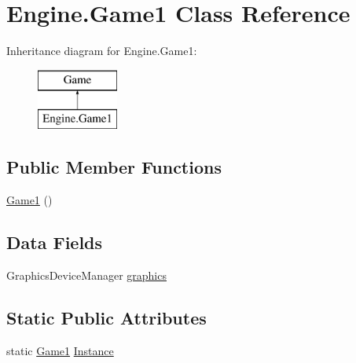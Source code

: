 \hypertarget{a00306}{}\section{Engine.\+Game1 Class Reference}
\label{a00306}
Inheritance diagram for Engine.\+Game1\+:\begin{figure}[H]
\begin{center}
\leavevmode
\includegraphics[height=2.000000cm]{d1/de3/a00306}
\end{center}
\end{figure}
\subsection*{Public Member Functions}
\begin{DoxyCompactItemize}
\item 
\hyperlink{a00306_a321d836485b0e6ba049e1200dee17c3b}{Game1} ()
\end{DoxyCompactItemize}
\subsection*{Data Fields}
\begin{DoxyCompactItemize}
\item 
Graphics\+Device\+Manager \hyperlink{a00306_a6080a5540f79b78b6604cba45c3e0817}{graphics}
\end{DoxyCompactItemize}
\subsection*{Static Public Attributes}
\begin{DoxyCompactItemize}
\item 
static \hyperlink{a00306}{Game1} \hyperlink{a00306_a6edc487a30ce1f26309e430b29e25f72}{Instance}
\end{DoxyCompactItemize}
